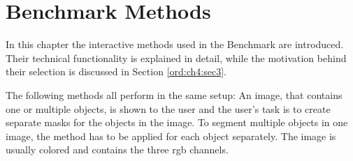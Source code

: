 
\chapter{Benchmark Methods}\label{ord:ch3}

In this chapter the interactive methods used in the Benchmark are introduced.
Their technical functionality is explained in detail, while the motivation behind their selection is discussed in Section \ref{ord:ch4:sec3}.

The following methods all perform in the same setup: An image, that contains one or multiple objects, is shown to the user and the user's task is to create separate masks for the objects in the image.
To segment multiple objects in one image, the method has to be applied for each object separately.
The image is usually colored and contains the three \gls{rgb} channels.




